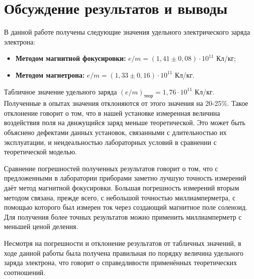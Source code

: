 \documentclass[a4paper,12pt]{article} %
\begin{document}
\section{Обсуждение результатов и выводы}

В данной работе получены следующие значения удельного электрического заряда электрона:

\begin{itemize}
    \item \textbf{Методом магнитной фокусировки:} $e/m = (1,41 \pm 0,08)\cdot 10^{11}$ Кл/кг;
    \item \textbf{Методом магнетрона:} $e/m = (1,33 \pm 0,16)\cdot 10^{11}$ Кл/кг.
\end{itemize}

Табличное значение удельного заряда $(e/m)_\text{теор} = 1,76\cdot 10^{11}$ Кл/кг. Полученные в опытах значения отклоняются от этого значения на 20-25\%. Такое отклонение говорит о том, что в нашей установке измеренная величина воздействия поля на движущийся заряд меньше теоретической. Это может быть объяснено дефектами данных установок, связанными с длительностью их эксплуатации, и неидеальностью лабораторных условий в сравнении с теоретической моделью.

Сравнение погрешностей полученных результатов говорит о том, что с предложенными в лаборатории приборами заметно лучшую точность измерений даёт метод магнитной фокусировки. Большая погрешность измерений вторым методом связана, прежде всего, с небольшой точностью миллиамперметра, с помощью которого был измерен ток через создающий магнитное поле соленоид. Для получения более точных результатов можно применить миллиамперметр с меньшей ценой деления.

Несмотря на погрешности и отклонение результатов от табличных значений, в ходе данной работы была получена правильная по порядку величина удельного заряда электрона, что говорит о справедливости применённых теоретических соотношений. 
\end{document}
